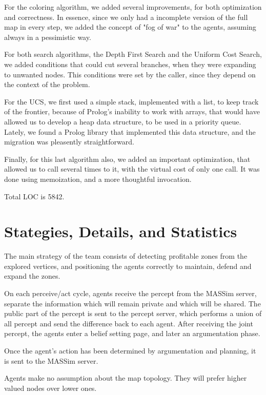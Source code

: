 \documentclass{llncs2e/llncs}
\begin{document}
    For the coloring algorithm, we added several improvements, for both 
    optimization and correctness. In essence, since we only had a incomplete 
    version of the full map in every step, we added the concept of "fog of war" to 
    the agents, assuming always in a pessimistic way. 

    For both search algorithms, the Depth First Search and the Uniform Cost 
    Search, we added conditions that could cut several branches, when they were 
    expanding to unwanted nodes. This conditions were set by the caller, since 
    they depend on the context of the problem.

    For the UCS, we first used a simple stack, implemented with a list, to keep 
    track of the frontier, because of Prolog's inability to work with arrays, that 
    would have allowed us to develop a heap data structure, to be used in a 
    priority queue. Lately, we found a Prolog library that implemented this data 
    structure, and the migration was pleasently straightforward.

    Finally, for this last algorithm also, we added an important optimization, 
    that allowed us to call several times to it, with the virtual cost of only one 
    call. It was done using memoization, and a more thoughtful invocation.

    Total LOC is 5842. 

\section{Stategies, Details, and Statistics}

    The main strategy of the team consists of detecting profitable zones from the 
    explored vertices, and positioning the agents correctly to maintain, defend 
    and expand the zones.

    On each perceive/act cycle, agents receive the percept from the MASSim server, 
    separate the information which will remain private and which will be shared. 
    The public part of the percept is sent to the percept server, which performs a 
    union of all percept and send the difference back to each agent. After 
    receiving the joint percept, the agents enter a belief setting page, and later 
    an argumentation phase.

    Once the agent's action has been determined by argumentation and planning, it 
    is sent to the MASSim server.

    Agents make no assumption about the map topology. They will prefer higher 
    valued nodes over lower ones.
\end{document}
